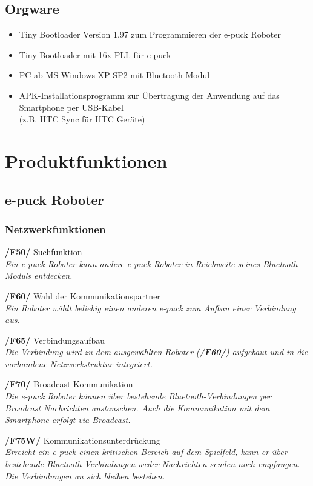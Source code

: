 \documentclass[10pt,a4paper]{article}
\let\oldsection\section
\renewcommand{\section}{\newpage \oldsection}
\begin{document}
		\subsection{Orgware}
			\begin{itemize}
				\item Tiny \gls{Bootloader} Version 1.97 zum Programmieren der e-puck Roboter
				\item Tiny Bootloader mit 16x \gls{PLL} für e-puck					
				\item PC ab MS Windows XP SP2 mit Bluetooth Modul
				\item APK-Installationsprogramm zur Übertragung der Anwendung auf das Smartphone per USB-Kabel \\
					(z.B. HTC Sync für HTC Geräte)
			\end{itemize}		
	\section{Produktfunktionen}
		\subsection{e-puck Roboter}
			\subsubsection{Netzwerkfunktionen}
				\begin{list}{}{\leftmargin=1cm}
					\item[\textbf{/F50/}] Suchfunktion
						\\ \textsl{Ein e-puck Roboter kann andere e-puck Roboter in Reichweite seines Bluetooth-Moduls entdecken.}
					\item[\textbf{/F60/}] Wahl der Kommunikationspartner
						\\ \textsl{Ein Roboter wählt beliebig einen anderen e-puck zum Aufbau einer Verbindung aus.}
					\item[\textbf{/F65/}] Verbindungsaufbau
						\\ \textsl{Die Verbindung wird zu dem ausgewählten Roboter (\textbf{/F60/}) aufgebaut und in die vorhandene
							Netzwerkstruktur integriert.}	
					\item[\textbf{/F70/}] Broadcast-Kommunikation
						\\ \textsl{Die e-puck Roboter können über bestehende Bluetooth-Verbindungen per Broadcast
						Nachrichten austauschen. Auch die Kommunikation mit dem Smartphone erfolgt via Broadcast.}
					\item[\textbf{/F75W/}] Kommunikationsunterdrückung
						\\ \textsl{Erreicht ein e-puck einen kritischen Bereich auf dem Spielfeld, kann er über bestehende
						Bluetooth-Verbindungen weder Nachrichten senden noch empfangen. Die Verbindungen an sich bleiben bestehen.}
				\end{list}
\end{document}
